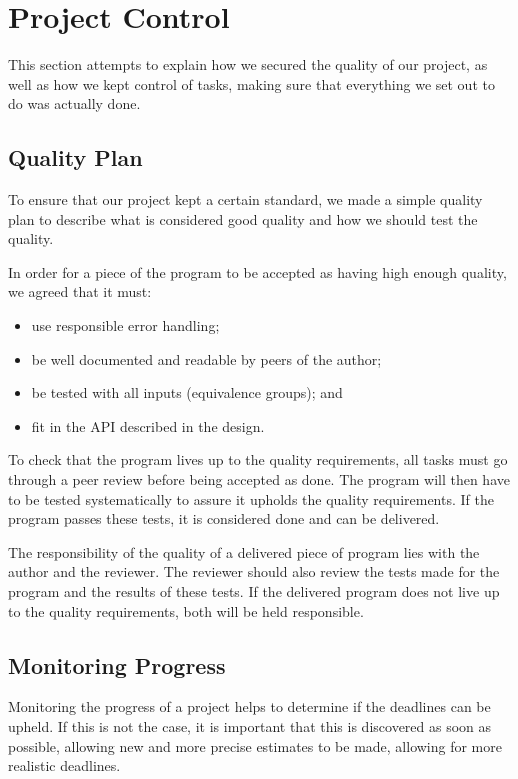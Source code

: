 \section{Project Control}
\label{sec:EmpiriControl}
This section attempts to explain how we secured the quality of our project, as well as how we kept control of tasks, making sure that everything we set out to do was actually done.

\subsection{Quality Plan}
\label{sec:EmpiriQualityControl}
To ensure that our project kept a certain standard, we made a simple quality plan to describe what is considered good quality and how we should test the quality.

In order for a piece of the program to be accepted as having high enough quality, we
agreed that it must:

\begin{itemize}
    \item use responsible error handling;
    \item be well documented and readable by peers of the author;
    \item be tested with all inputs (equivalence groups); and
    \item fit in the API described in the design.
\end{itemize}

To check that the program lives up to the quality requirements, all tasks must go through a peer review before being accepted as done. The program will then have to be tested systematically to assure it upholds the quality requirements. If the program passes these tests, it is considered done and can be delivered.

The responsibility of the quality of a delivered piece of program lies with the author
and the reviewer. The reviewer should also review the tests made for the program and
the results of these tests. If the delivered program does not live up to the quality
requirements, both will be held responsible.

\subsection{Monitoring Progress}
\label{sec:EmpiriProgress}

Monitoring the progress of a project helps to determine if the deadlines can be upheld.
If this is not the case, it is important that this is discovered as soon as possible,
allowing new and more precise estimates to be made, allowing for more realistic deadlines.


